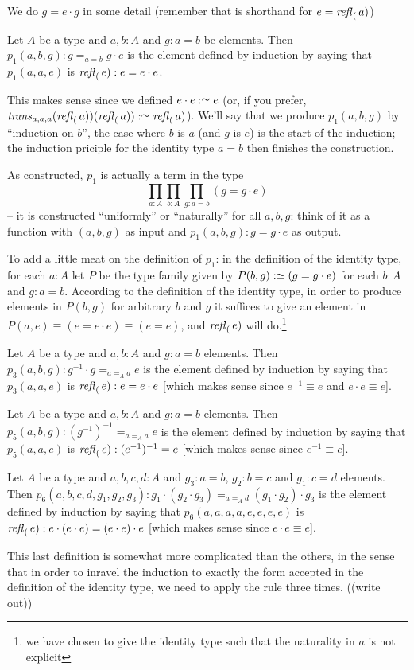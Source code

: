 We do $g=e\cdot g$ in some detail (remember that is shorthand for $e=\mathop{{\it refl}_{(}}a)$)
\begin{definition}
  Let $A$ be a type and $a, b:A$ and $g:a=b$ be elements.  Then $p_1(a,b,g):g=_{a=b}g\cdot e$ is the element defined by induction by saying that $p_1(a,a,e)$ is $\mathop{{\it refl}_{(}}e):e=e\cdot e$.
\end{definition}
\begin{remark}
  This makes sense since we defined $e\cdot e:\simeq e$ (or, if you prefer, $\mathop{\mathit{trans}}_{a,a,a}(\mathop{{\it refl}_{(}}a))(\mathop{{\it refl}_{(}}a)):\simeq \mathop{{\it refl}_{(}}a)$).  We'll say that we produce $p_1(a,b,g)$ by ``induction on $b$'', the case where $b$ is $a$ (and $g$ is $e$) is the start of the induction; the induction priciple for the identity type $a=b$ then finishes the construction.

As constructed, $p_1$ is actually a term in the type 
$$\prod_{a:A}\prod_{b:A}\prod_{g:a=b}(g=g\cdot e)$$ -- it is constructed ``uniformly'' or ``naturally'' for all $a,b,g$: think of it as a function with $(a,b,g)$ as input and $p_1(a,b,g):g=g\cdot e$ as output.  

To add a little meat on the definition of $p_1$: in the definition of the identity type, for each $a:A$ let $P$ be the type family given by $P(b,g):\simeq (g=g\cdot e)$ for each $b:A$ and $g:a=b$.  According to the definition of the identity type, in order to produce elements in $P(b,g)$ for arbitrary $b$ and $g$ it suffices to give an element in $P(a,e)\equiv (e=e\cdot e)\equiv (e=e)$, and $\mathop{{\it refl}_{(}}e)$ will do.\footnote{we have chosen to give the identity type such that the naturality in $a$ is not explicit}
\end{remark}
\begin{definition}
  Let $A$ be a type and $a,b:A$ and $g:a=b$ elements.  Then $p_3(a,b,g):g^{-1}\cdot g=_{a=_Aa} e$ is the element defined by induction by saying that $p_3(a,a,e)$ is $\mathop{{\it refl}_{(}}e):e=e\cdot e$ [which makes sense since $e^{-1}\equiv e$ and $e\cdot e\equiv e$].
\end{definition}
\begin{definition}
  Let $A$ be a type and $a,b:A$ and $g:a=b$ elements.  Then $p_5(a,b,g):(g^{-1})^{-1}=_{a=_Aa} e$ is the element defined by induction by saying that $p_5(a,a,e)$ is $\mathop{{\it refl}_{(}}e):(e^{-1})^{-1}=e$ [which makes sense since $e^{-1}\equiv e$].
\end{definition}
\begin{definition}
  Let $A$ be a type and $a,b,c,d:A$ and $g_3:a=b$, $g_2:b=c$ and $g_1:c=d$ elements.  Then $p_6(a,b,c,d,g_1,g_2,g_3):g_1\cdot(g_2\cdot g_3)=_{a=_Ad}(g_1\cdot g_2)\cdot g_3$ is the element defined by induction by saying that $p_6(a,a,a,a,e,e,e,e)$ is $\mathop{{\it refl}_{(}}e):e\cdot(e\cdot e)=(e\cdot e)\cdot e$ [which makes sense since $e\cdot e\equiv e$].
\end{definition}
\begin{remark}
  This last definition is somewhat more complicated than the others, in the sense that in order to inravel the induction to exactly the form accepted in the definition of the identity type, we need to apply the rule three times.  ((write out))
\end{remark}

